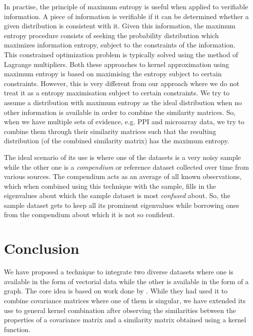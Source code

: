 In practise, the principle of maximum entropy is useful when applied to verifiable information. A piece of information is verifiable if it can 
be determined whether a given distribution is consistent with it. Given this information, the maximum entropy procedure consists 
of seeking the probability distribution which maximizes information entropy, subject to the constraints of the information. This constrained 
optimization problem is typically solved using the method of Lagrange multipliers. Both these approaches to kernel approximation 
\citep{Tsuda2004Learning, fujibuchi2007classification} using maximum entropy is based on maximising the entropy subject to certain 
constraints. However, this is very different from our approach where we do not treat it as a entropy maximisation subject to certain constraints. 
We try to assume a distribution with maximum entropy as the ideal distribution when no other information is available in order to combine the 
similarity matrices. So, when we have multiple sets of evidence, e.g. PPI and microarray data, we try to combine them through their similarity 
matrices such that the resulting distribution (of the combined similarity matrix) has the maximum entropy.

The ideal scenario of its use is where one of the datasets is a very noisy sample while the other one is a \textit{compendium} or 
reference dataset collected over time from various sources. The compendium acts as an average of all known observations, which when 
combined using this technique with the sample, fills in the eigenvalues about which the sample dataset is most \textit{confused} about. 
So, the sample dataset gets to keep all its prominent eigenvalues while borrowing ones from the compendium about which it is not so confident. 


\section{Conclusion}

We have proposed a technique to integrate two diverse datasets where one is available in the form of vectorial data while the 
other is available in the form of a graph. The core idea is based on work done by \citet{thomaz2004covariance}. While they had 
used it to combine covariance matrices where one of them is singular, we have extended its use to general kernel combination after 
observing the similarities between the properties of a covariance matrix and a similarity matrix obtained using a kernel function. 


